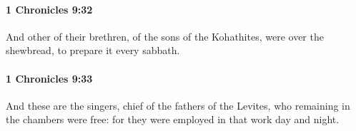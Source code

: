 		\paragraph{1 Chronicles 9:32} %
			\label{1CHRONICLES-9-32}

			And other of their brethren, of the sons of the Kohathites, were over the shewbread, to prepare it every sabbath.


		\paragraph{1 Chronicles 9:33} %
			\label{1CHRONICLES-9-33}

			And these are the singers, chief of the fathers of the Levites, who remaining in the chambers were free: for they were employed in that work day and night.


